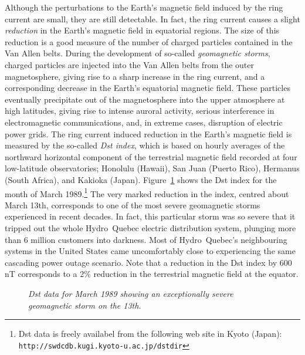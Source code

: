 Although the perturbations to the Earth's magnetic field induced by the ring
current are small, they are still detectable. In fact, the ring current
causes a slight {\em reduction}\/ in the Earth's magnetic field in equatorial
regions. The size of this reduction is a good measure of the
number of charged particles contained in the Van Allen belts. During
the development of so-called {\em geomagnetic storms}, charged particles are
injected into the Van Allen belts from the outer magnetosphere, giving rise
to a sharp increase in the ring current, and a corresponding decrease in the
Earth's equatorial magnetic field. These particles eventually precipitate
out of the magnetosphere into the upper atmosphere
at high latitudes, giving rise to intense
auroral activity, serious interference in electromagnetic communications, and, in extreme
cases,  disruption of electric
power grids. The ring current induced reduction in the
Earth's magnetic field is measured by the so-called
{\em Dst index}, which is based on
hourly averages of the northward horizontal component of the terrestrial
magnetic 
field recorded at four low-latitude observatories; Honolulu (Hawaii), 
San Juan (Puerto Rico), Hermanus (South Africa),
and Kakioka (Japan). Figure~\ref{f5} shows the Dst index for the month of March
1989.\footnote{Dst data
is freely availabel from the following web site in Kyoto (Japan): {\tt
 http://swdcdb.kugi.kyoto-u.ac.jp/dstdir}}
The very marked reduction in the index, centred about March 13th, corresponds
to one of the most severe geomagnetic storms experienced in recent decades. 
In fact, this particular storm was so severe that it tripped out the
whole Hydro~Quebec electric distribution system, plunging more than 6 million
customers into darkness. Most of Hydro~Quebec's neighbouring systems in the United
States came uncomfortably close to experiencing the same cascading power
outage scenario. Note that a reduction in the  Dst index by 600\,nT
corresponds to a $2\%$ reduction in the terrestrial magnetic field at the equator.

\begin{figure}
\epsfysize=1.2in
\centerline{}
\caption{\em Dst data for March 1989 showing an exceptionally
severe geomagnetic storm on the 13th.}\label{f5}
\end{figure}

